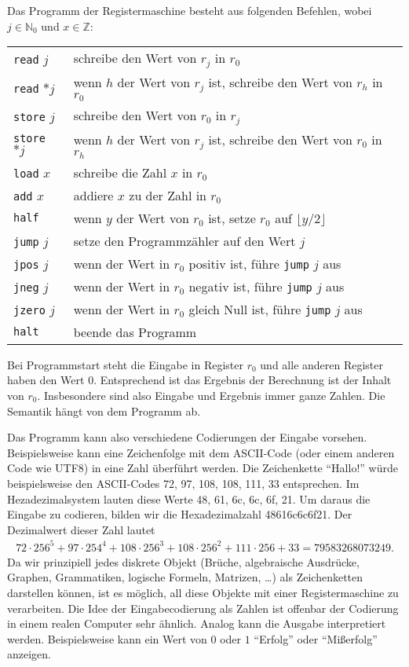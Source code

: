 \documentclass[10pt,reqno]{amsart}
\numberwithin{equation}{section}
\newcommand\NN{\mathbb N}
\newcommand\ZZ{\mathbb Z}
\begin{document}
Das Programm der Registermaschine besteht aus folgenden Befehlen, wobei $j\in\NN_0$ und $x\in\ZZ$:

\begin{center}
\begin{tabular}{|l|l|}\hline
	{\tt read} $j$&schreibe den Wert von $r_j$ in $r_0$\\
	{\tt read} $*j$&wenn $h$ der Wert von $r_j$ ist, schreibe den Wert von $r_h$ in $r_0$\\
	{\tt store} $j$&schreibe den Wert von $r_0$ in $r_j$\\
	{\tt store} $*j$&wenn $h$ der Wert von $r_j$ ist, schreibe den Wert von $r_0$ in $r_h$\\
	{\tt load} $x$&schreibe die Zahl $x$ in $r_0$\\
	{\tt add} $x$&addiere $x$ zu der Zahl in $r_0$\\
	{\tt half}&wenn $y$ der Wert von $r_0$ ist, setze $r_0$ auf $\lfloor y/2\rfloor$\\
	{\tt jump} $j$&setze den Programmz\"ahler auf den Wert $j$\\
	{\tt jpos} $j$&wenn der Wert in $r_0$ positiv ist, f\"uhre {\tt jump} $j$ aus\\
	{\tt jneg} $j$&wenn der Wert in $r_0$ negativ ist, f\"uhre {\tt jump} $j$ aus\\
	{\tt jzero} $j$&wenn der Wert in $r_0$ gleich Null ist, f\"uhre {\tt jump} $j$ aus\\
	{\tt halt}&beende das Programm\\\hline
\end{tabular}
\end{center}

Bei Programmstart steht die Eingabe in Register $r_0$ und alle anderen Register haben den Wert $0$.
Entsprechend ist das Ergebnis der Berechnung ist der Inhalt von $r_0$.
Insbesondere sind also Eingabe und Ergebnis immer ganze Zahlen.
Die Semantik h\"angt von dem Programm ab.

Das Programm kann also verschiedene Codierungen der Eingabe vorsehen.
Beispielsweise kann eine Zeichenfolge mit dem ASCII-Code (oder einem anderen Code wie UTF8) in eine Zahl \"uberf\"uhrt werden.
Die Zeichenkette ``Hallo!'' w\"urde beispielsweise den ASCII-Codes 72, 97, 108, 108, 111, 33 entsprechen.
Im Hezadezimalsystem lauten diese Werte 48, 61, 6c, 6c, 6f, 21.
Um daraus die Eingabe zu codieren, bilden wir die Hexadezimalzahl 48616c6c6f21.
Der Dezimalwert dieser Zahl lautet
\begin{align*}
72\cdot256^5+97\cdot254^4+108\cdot256^3+108\cdot256^2+111\cdot256+33=79583268073249.
\end{align*}
Da wir prinzipiell jedes diskrete Objekt (Br\"uche, algebraische Ausdr\"ucke, Graphen, Grammatiken, logische Formeln, Matrizen, \ldots) als Zeichenketten darstellen k\"onnen, ist es m\"oglich, all diese Objekte mit einer Registermaschine zu verarbeiten.
Die Idee der Eingabecodierung als Zahlen ist offenbar der Codierung in einem realen Computer sehr \"ahnlich. 
Analog kann die Ausgabe interpretiert werden.
Beispielsweise kann ein Wert von $0$ oder $1$ ``Erfolg'' oder ``Mi\ss erfolg'' anzeigen.
\end{document}
